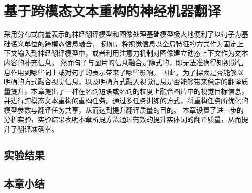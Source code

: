 \chapter{基于跨模态文本重构的神经机器翻译}

% 


采用分布式向量表示的神经翻译模型和图像处理基础模型极大地便利了以句子为基础语义单位的跨模态信息融合，
例如，将视觉信息以全局特征的方式作为固定上下文输入到神经翻译模型中，或者利用注意力机制对图像建立动态上下文作为文本内容的补充信息。
然而句子与图片的信息融合是隐式的，即无法准确得知视觉信息作用到哪些词上或对句子的表示带来了哪些影响。
因此，为了探索是否能够以明确的方式融合视觉信息，以及明确方式融入视觉信息是否能够带来稳定的翻译质量提升，本章提出了一种在名词短语或名词的粒度上融合图片中的视觉目标信息，并进行跨模态文本重构的重构任务。通过多任务训练的方式，将重构任务所优化的模型参数与翻译任务共享，从而达到提升翻译质量的目的。
本章设置了进一步的分析实验，实验结果表明本章所提方法通过有效的提升实体词的翻译质量，从而提升了翻译准确率。







\section{实验结果}

\section{本章小结}
